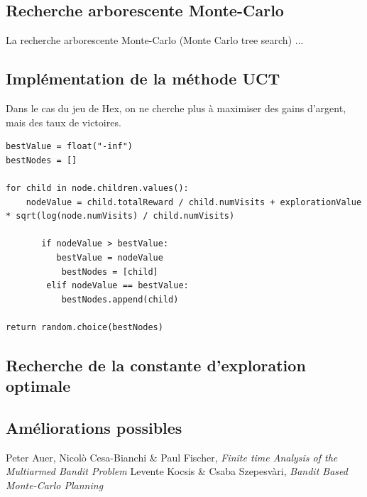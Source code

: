 \documentclass[a4paper]{article}
\theoremstyle{definition}
\begin{document}
\subsection{Recherche arborescente Monte-Carlo}

La recherche arborescente Monte-Carlo (Monte Carlo tree search) ...

\subsection{Implémentation de la méthode UCT}

Dans le cas du jeu de Hex, on ne cherche plus à maximiser des gains d'argent, mais des taux de victoires.

\begin{lstlisting}
bestValue = float("-inf")
bestNodes = []

for child in node.children.values():
	nodeValue = child.totalReward / child.numVisits + explorationValue * sqrt(log(node.numVisits) / child.numVisits)
	
       if nodeValue > bestValue:
       	  bestValue = nodeValue
           bestNodes = [child]
        elif nodeValue == bestValue:
           bestNodes.append(child)
             
return random.choice(bestNodes)
\end{lstlisting}

\subsection{Recherche de la constante d'exploration optimale}

\subsection{Améliorations possibles}

\clearpage
%
\begin{thebibliography}{9}

Peter Auer, Nicol\`o Cesa-Bianchi \& Paul Fischer, {\em Finite time Analysis of the Multiarmed Bandit Problem}
Levente Kocsis \& Csaba Szepesv\`ari, {\em Bandit Based Monte-Carlo Planning}

\end{thebibliography}
\end{document}
